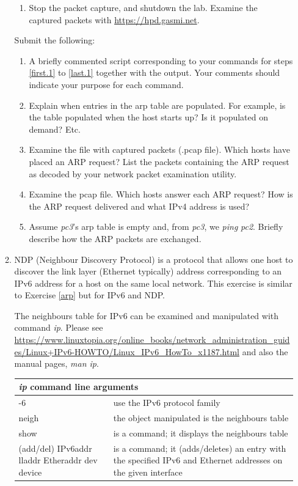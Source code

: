 \documentclass[12pt]{book}
\begin{document}
\begin{enumerate}[label=\arabic*.]
\begin{enumerate}
\begin{enumerate}[label=(\roman*)]
  \item\label{last.1} Stop the packet capture, and shutdown the lab. Examine the captured packets with   \url{https://hpd.gasmi.net}.
  \end{enumerate}

  Submit the following:
  \begin{enumerate}[label=(\alph*)]
  \item A briefly commented script corresponding to your commands for steps \ref{first.1} to \ref{last.1} together with the output. Your comments should indicate your purpose for each command.
  \item Explain when entries in the arp table are populated. For example, is the table populated when the host starts up? Is it populated on demand? Etc.
  \item Examine the file with captured packets (.pcap file). Which hosts have placed an ARP request? List the packets containing the ARP request as decoded     by your network packet examination utility.
    \item Examine the pcap file. Which hosts answer each ARP request?
      How is the ARP request delivered and what IPv4
      address is used?
  \item Assume \emph{pc3}'s arp table is empty and, from \emph{pc3}, we \emph{ping} \emph{pc2}. Briefly describe how the ARP packets are exchanged. 
  \end{enumerate}

\item NDP (Neighbour Discovery Protocol) is a protocol that allows one host to discover the link layer (Ethernet typically) address corresponding to an IPv6 address for a host on the same local network. This exercise is similar to Exercise \ref{arp} but for IPv6 and NDP.

The neighbours table for IPv6 can be examined and manipulated with command \emph{ip}. Please see \url{https://www.linuxtopia.org/online_books/network_administration_guides/Linux+IPv6-HOWTO/Linux_IPv6_HowTo_x1187.html} and also the manual pages, \emph{man ip}.

\smallskip
\begin{tabularx}{0.9\textwidth}{p{5cm} X} \toprule
  \multicolumn{2}{l}{\emph{ip} command line arguments} \\ \midrule
  -6 & use the IPv6 protocol family \\
  neigh & the object manipulated is the neighbours table \\
  show & is a command; it displays the neighbours table \\
  (add/del) IPv6addr lladdr Etheraddr dev device & is a command; it  (adds/deletes) an entry with the specified IPv6 and Ethernet addresses on the given interface\\ \bottomrule
  \end{tabularx}
\smallskip


\end{enumerate}
\end{enumerate}
\end{document}
